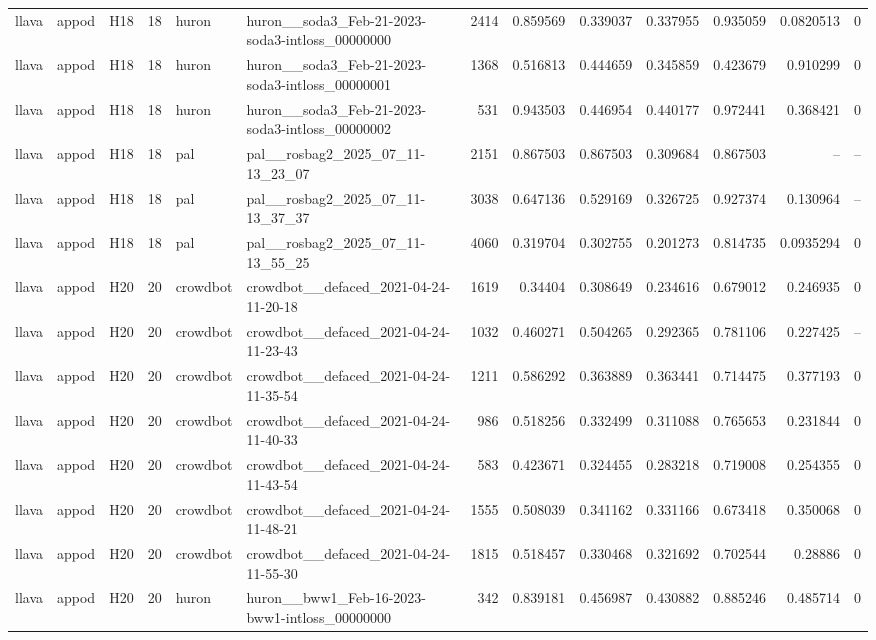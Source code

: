 \begin{longtable}{lllrllrrrrrrr}
llava & appod & H18 & 18 & huron & huron\_\_soda3\_Feb-21-2023-soda3-intloss\_00000000 & 2414 & 0.859569 & 0.339037 & 0.337955 & 0.935059 & 0.0820513 & 0 \\
llava & appod & H18 & 18 & huron & huron\_\_soda3\_Feb-21-2023-soda3-intloss\_00000001 & 1368 & 0.516813 & 0.444659 & 0.345859 & 0.423679 & 0.910299 & 0 \\
llava & appod & H18 & 18 & huron & huron\_\_soda3\_Feb-21-2023-soda3-intloss\_00000002 & 531 & 0.943503 & 0.446954 & 0.440177 & 0.972441 & 0.368421 & 0 \\
llava & appod & H18 & 18 & pal & pal\_\_rosbag2\_2025\_07\_11-13\_23\_07 & 2151 & 0.867503 & 0.867503 & 0.309684 & 0.867503 & -- & -- \\
llava & appod & H18 & 18 & pal & pal\_\_rosbag2\_2025\_07\_11-13\_37\_37 & 3038 & 0.647136 & 0.529169 & 0.326725 & 0.927374 & 0.130964 & -- \\
llava & appod & H18 & 18 & pal & pal\_\_rosbag2\_2025\_07\_11-13\_55\_25 & 4060 & 0.319704 & 0.302755 & 0.201273 & 0.814735 & 0.0935294 & 0 \\
llava & appod & H20 & 20 & crowdbot & crowdbot\_\_defaced\_2021-04-24-11-20-18 & 1619 & 0.34404 & 0.308649 & 0.234616 & 0.679012 & 0.246935 & 0 \\
llava & appod & H20 & 20 & crowdbot & crowdbot\_\_defaced\_2021-04-24-11-23-43 & 1032 & 0.460271 & 0.504265 & 0.292365 & 0.781106 & 0.227425 & -- \\
llava & appod & H20 & 20 & crowdbot & crowdbot\_\_defaced\_2021-04-24-11-35-54 & 1211 & 0.586292 & 0.363889 & 0.363441 & 0.714475 & 0.377193 & 0 \\
llava & appod & H20 & 20 & crowdbot & crowdbot\_\_defaced\_2021-04-24-11-40-33 & 986 & 0.518256 & 0.332499 & 0.311088 & 0.765653 & 0.231844 & 0 \\
llava & appod & H20 & 20 & crowdbot & crowdbot\_\_defaced\_2021-04-24-11-43-54 & 583 & 0.423671 & 0.324455 & 0.283218 & 0.719008 & 0.254355 & 0 \\
llava & appod & H20 & 20 & crowdbot & crowdbot\_\_defaced\_2021-04-24-11-48-21 & 1555 & 0.508039 & 0.341162 & 0.331166 & 0.673418 & 0.350068 & 0 \\
llava & appod & H20 & 20 & crowdbot & crowdbot\_\_defaced\_2021-04-24-11-55-30 & 1815 & 0.518457 & 0.330468 & 0.321692 & 0.702544 & 0.28886 & 0 \\
llava & appod & H20 & 20 & huron & huron\_\_bww1\_Feb-16-2023-bww1-intloss\_00000000 & 342 & 0.839181 & 0.456987 & 0.430882 & 0.885246 & 0.485714 & 0 \\

\end{longtable}
